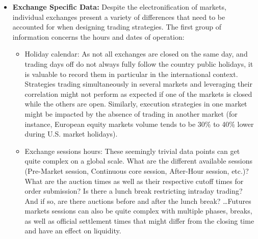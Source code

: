 \begin{itemize}
Maintaining a table of the quotation currency per instrument is also necessary in order to be able to aggregate positions at a portfolio level. Some exchanges allow the quotation of prices in currencies different from the one of the country in which the exchange is located.\footnote{For example, Jardine Matheson Holdings quotes in USD on the Singapore exchange while most of the other securities quote in Singapore Dollars.} Additionally, the Quote Factor associated with the quotation currency data needs to be stored. To account for the wide range of currency values and preserve pricing precision, market data providers might be publishing FX rates with a factor of 100 or 1000. Hence, to convert prices to USD one needs to multiply by the quote factor: usd price $=$ local price $\cdot$ fx $\cdot$ quote factor. Similarly, some exchanges quote prices in cents, and the associated quotation currency is reflected with a small cap letter: GBP/GBp, ZAR/ZAr, ILS/ILs, \dots).


\item \textbf{Exchange Specific Data:}  Despite the electronification of markets, individual exchanges present a variety of differences that need to be accounted for when designing trading strategies. The first group of information concerns the hours and dates of operation:
\begin{itemize}
\item Holiday calendar: As not all exchanges are closed on the same day, and trading days off do not always fully follow the country public holidays, it is valuable to record them in particular in the international context. Strategies trading simultaneously in several markets and leveraging their correlation might not perform as expected if one of the markets is closed while the others are open. Similarly, execution strategies in one market might be impacted by the absence of trading in another market (for instance, European equity markets volume tends to be 30\% to 40\% lower during U.S. market holidays).

\item Exchange sessions hours: These seemingly trivial data points can get quite complex on a global scale. What are the different available sessions (Pre-Market session, Continuous core session, After-Hour session, etc.)? What are the auction times as well as their respective cutoff times for order submission? Is there a lunch break restricting intraday trading? And if so, are there auctions before and after the lunch break? \dots Futures markets sessions can also be quite complex with multiple phases, breaks, as well as official settlement times that might differ from the closing time and have an effect on liquidity.



\end{itemize}
\end{itemize}
